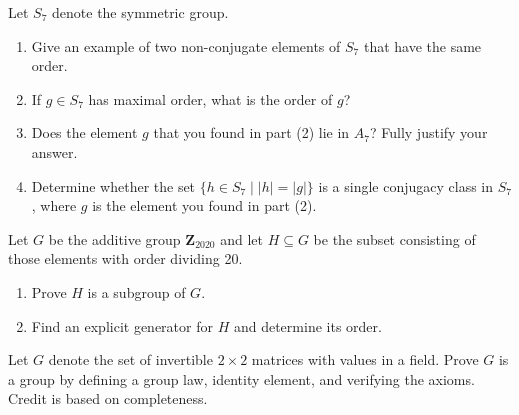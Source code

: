 \documentclass[11pt,twoside,openany]{memoir}
\begin{document}
            \begin{exercise}
            Let $S_7$ denote the symmetric group.
            \begin{enumerate}[label = (\arabic*)]
                \item Give an example of two non-conjugate elements of $S_7$ that have the same order.
                \item If $g\in S_7$ has maximal order, what is the order of $g$?
                \item Does the element $g$ that you found in part (2) lie in $A_7$? Fully justify your answer.
                \item Determine whether the set $\{h\in S_7 \mid |h|=|g|\}$ is a single conjugacy class in $S_7$, where $g$ is the element you found in part (2).
            \end{enumerate}
            \end{exercise}
            
            \begin{exercise}
            Let $G$ be the additive group $\mathbf{Z}_{2020}$ and let $H\subseteq G$ be the subset consisting of those elements with order dividing 20.
            \begin{enumerate}[label = (\arabic*)]
                \item Prove $H$ is a subgroup of $G$.
                \item Find an explicit generator for $H$ and determine its order.
            \end{enumerate}
            \end{exercise}
            
            \begin{exercise}
            Let $G$ denote the set of invertible $2\times 2$ matrices with values in a field. Prove $G$ is a group by defining a group law, identity element, and verifying the axioms. Credit is based on completeness.
            \end{exercise}
\end{document}
